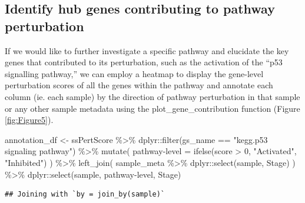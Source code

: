\documentclass[9pt,a4paper,]{extarticle}
\newenvironment{Shaded}{\begin{snugshade}}{\end{snugshade}}
\newcommand{\AttributeTok}[1]{\textcolor[rgb]{0.77,0.63,0.00}{#1}}
\newcommand{\DecValTok}[1]{\textcolor[rgb]{0.00,0.00,0.81}{#1}}
\newcommand{\FunctionTok}[1]{\textcolor[rgb]{0.00,0.00,0.00}{#1}}
\newcommand{\NormalTok}[1]{#1}
\newcommand{\OtherTok}[1]{\textcolor[rgb]{0.56,0.35,0.01}{#1}}
\newcommand{\SpecialCharTok}[1]{\textcolor[rgb]{0.00,0.00,0.00}{#1}}
\newcommand{\StringTok}[1]{\textcolor[rgb]{0.31,0.60,0.02}{#1}}
\begin{document}
\hypertarget{identify-hub-genes-contributing-to-pathway-perturbation}{%
\subsection{Identify hub genes contributing to pathway perturbation}\label{identify-hub-genes-contributing-to-pathway-perturbation}}

If we would like to further investigate a specific pathway and elucidate the key genes that contributed to its perturbation, such as the activation of the ``p53 signalling pathway,'' we can employ a heatmap to display the gene-level perturbation scores of all the genes within the pathway and annotate each column (ie. each sample) by the direction of pathway perturbation in that sample or any other sample metadata using the plot\_gene\_contribution function (Figure \ref{fig:Figure5}).

\begin{Shaded}
\begin{Highlighting}[]
\NormalTok{annotation\_df }\OtherTok{\textless{}{-}}\NormalTok{ ssPertScore }\SpecialCharTok{\%\textgreater{}\%}
\NormalTok{    dplyr}\SpecialCharTok{::}\FunctionTok{filter}\NormalTok{(gs\_name }\SpecialCharTok{==} \StringTok{"kegg.p53 signaling pathway"}\NormalTok{) }\SpecialCharTok{\%\textgreater{}\%}
    \FunctionTok{mutate}\NormalTok{(}
        \StringTok{\textasciigrave{}}\AttributeTok{pathway{-}level}\StringTok{\textasciigrave{}} \OtherTok{=} \FunctionTok{ifelse}\NormalTok{(score }\SpecialCharTok{\textgreater{}} \DecValTok{0}\NormalTok{, }\StringTok{"Activated"}\NormalTok{, }\StringTok{"Inhibited"}\NormalTok{)}
\NormalTok{    ) }\SpecialCharTok{\%\textgreater{}\%}
    \FunctionTok{left\_join}\NormalTok{(}
\NormalTok{        sample\_meta }\SpecialCharTok{\%\textgreater{}\%}
\NormalTok{            dplyr}\SpecialCharTok{::}\FunctionTok{select}\NormalTok{(sample, Stage)}
\NormalTok{    ) }\SpecialCharTok{\%\textgreater{}\%}
\NormalTok{    dplyr}\SpecialCharTok{::}\FunctionTok{select}\NormalTok{(sample, }\StringTok{\textasciigrave{}}\AttributeTok{pathway{-}level}\StringTok{\textasciigrave{}}\NormalTok{, Stage)}
\end{Highlighting}
\end{Shaded}

\begin{verbatim}
## Joining with `by = join_by(sample)`
\end{verbatim}
\end{document}
